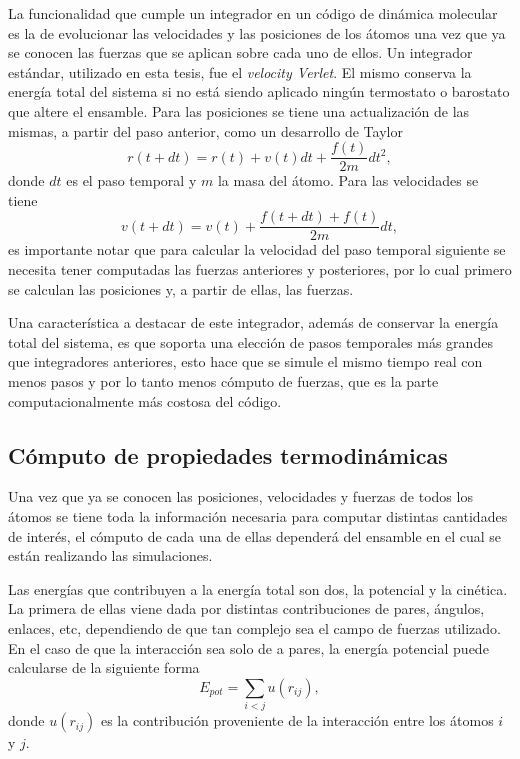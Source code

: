 La funcionalidad que cumple un integrador en un código de dinámica molecular es
la de evolucionar las velocidades y las posiciones de los átomos una vez que 
ya se conocen las fuerzas que se aplican sobre cada uno de ellos. Un integrador
estándar, utilizado en esta tesis, fue el \textit{velocity Verlet}. El mismo 
conserva la energía total del sistema si no está siendo aplicado ningún termostato
o barostato que altere el ensamble. Para las posiciones se tiene una
actualización de las mismas, a partir del paso anterior, como un desarrollo de
Taylor
\begin{equation*}
r(t+dt) = r(t) + v(t) dt + \frac{f(t)}{2m} dt^2,
\end{equation*}
donde $dt$ es el paso temporal y $m$ la masa del átomo. Para las velocidades se
tiene
\begin{equation*}
v(t+dt) = v(t) + \frac{f(t+dt)+f(t)}{2m} dt,
\end{equation*}
es importante notar que para calcular la velocidad del paso temporal siguiente se
necesita tener computadas las fuerzas anteriores y posteriores, por lo cual
primero se calculan las posiciones y, a partir de ellas, las fuerzas.

Una característica a destacar de este integrador, además de conservar la energía
total del sistema, es que soporta una elección de pasos temporales más grandes
que integradores anteriores, esto hace que se simule el mismo tiempo real con 
menos pasos y por lo tanto menos cómputo de fuerzas, que es la parte 
computacionalmente más costosa del código.

\subsection{Cómputo de propiedades termodinámicas}

Una vez que ya se conocen las posiciones, velocidades y fuerzas de todos los 
átomos se tiene toda la información necesaria para computar distintas
cantidades de interés, el cómputo de cada una de ellas dependerá del ensamble en
el cual se están realizando las simulaciones.

Las energías que contribuyen a la energía total son dos, la potencial y la
cinética. La primera de ellas viene dada por distintas contribuciones de pares, 
ángulos, enlaces, etc, dependiendo de que tan complejo sea el campo de fuerzas 
utilizado. En el caso de que la interacción sea solo de a pares, la energía 
potencial puede calcularse de la siguiente forma
\begin{equation*}
E_{pot} = \sum_{i < j} u(r_{ij}),
\end{equation*}
donde $u(r_{ij})$ es la contribución proveniente de la interacción entre los 
átomos $i$ y $j$.

